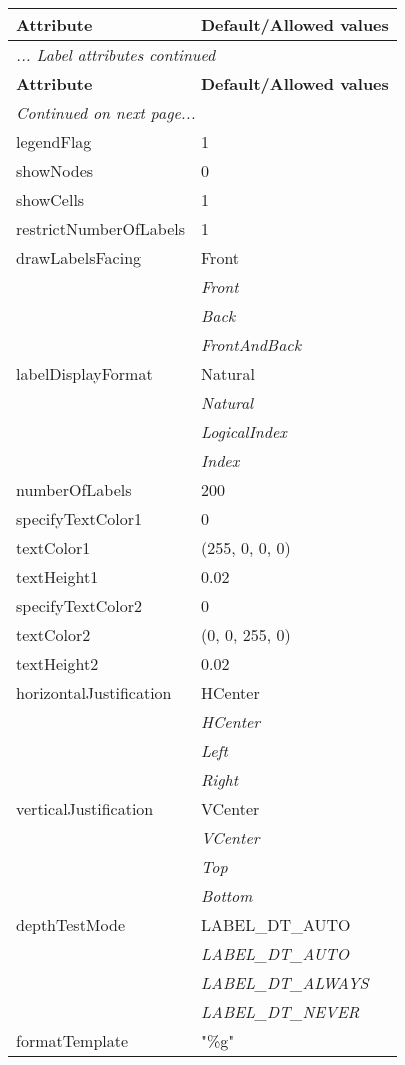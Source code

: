 \documentclass[10pt,a4paper]{report}
\begin{document}
\begin{longtable}{ll}
{\bf Attribute} & {\bf Default/Allowed values} \\
\hline \hline
\endfirsthead
\multicolumn{2}{l}{{\it ... Label attributes continued}} \\
{\bf Attribute} & {\bf Default/Allowed values} \\
\hline \hline
\endhead
\hline
\multicolumn{2}{l}{{\it Continued on next page...}} \\
\endfoot
\hline
\endlastfoot

legendFlag  &  1 \\
showNodes  &  0 \\
showCells  &  1 \\
restrictNumberOfLabels  &  1 \\
drawLabelsFacing  &  Front   \\
 & {\it  Front} \\
 & {\it  Back} \\
 & {\it  FrontAndBack} \\
labelDisplayFormat  &  Natural   \\
 & {\it  Natural} \\
 & {\it  LogicalIndex} \\
 & {\it  Index} \\
numberOfLabels  &  200 \\
specifyTextColor1  &  0 \\
textColor1  &  (255, 0, 0, 0) \\
textHeight1  &  0.02 \\
specifyTextColor2  &  0 \\
textColor2  &  (0, 0, 255, 0) \\
textHeight2  &  0.02 \\
horizontalJustification  &  HCenter   \\
 & {\it  HCenter} \\
 & {\it  Left} \\
 & {\it  Right} \\
verticalJustification  &  VCenter   \\
 & {\it  VCenter} \\
 & {\it  Top} \\
 & {\it  Bottom} \\
depthTestMode  &  LABEL\_DT\_AUTO   \\
 & {\it  LABEL\_DT\_AUTO} \\
 & {\it  LABEL\_DT\_ALWAYS} \\
 & {\it  LABEL\_DT\_NEVER} \\
formatTemplate  &  "\%g" \\
\end{longtable}
\end{document}
